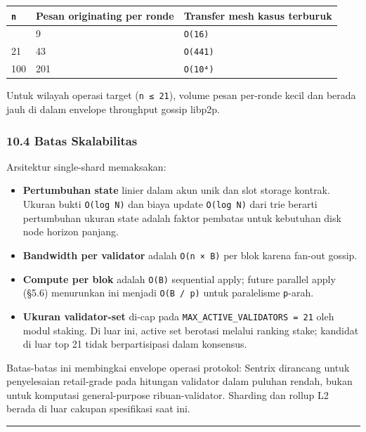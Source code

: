 \documentclass[11pt,a4paper]{article}
\providecommand{\tightlist}{\setlength{\itemsep}{0pt}\setlength{\parskip}{0pt}}
\begin{document}
\begin{longtable}[]{@{}lll@{}}
\toprule\noalign{}
\texttt{n} & Pesan originating per ronde & Transfer mesh kasus terburuk \\
\midrule\noalign{}
\endhead
\bottomrule\noalign{}
\endlastfoot
4 & 9 & \texttt{O(16)} \\
21 & 43 & \texttt{O(441)} \\
100 & 201 & \texttt{O(10⁴)} \\
\end{longtable}

Untuk wilayah operasi target (\texttt{n\ ≤\ 21}), volume pesan per-ronde kecil dan berada jauh di dalam envelope throughput gossip libp2p.

\hypertarget{batas-skalabilitas}{%
\subsubsection{10.4 Batas Skalabilitas}\label{batas-skalabilitas}}

Arsitektur single-shard memaksakan:

\begin{itemize}
\tightlist
\item
  \textbf{Pertumbuhan state} linier dalam akun unik dan slot storage kontrak. Ukuran bukti \texttt{O(log\ N)} dan biaya update \texttt{O(log\ N)} dari trie berarti pertumbuhan ukuran state adalah faktor pembatas untuk kebutuhan disk node horizon panjang.
\item
  \textbf{Bandwidth per validator} adalah \texttt{O(n\ ×\ \textbar{}B\textbar{})} per blok karena fan-out gossip.
\item
  \textbf{Compute per blok} adalah \texttt{O(\textbar{}B\textbar{})} sequential apply; future parallel apply (§5.6) menurunkan ini menjadi \texttt{O(\textbar{}B\textbar{}\ /\ p)} untuk paralelisme \texttt{p}-arah.
\item
  \textbf{Ukuran validator-set} di-cap pada \texttt{MAX\_ACTIVE\_VALIDATORS\ =\ 21} oleh modul staking. Di luar ini, active set berotasi melalui ranking stake; kandidat di luar top 21 tidak berpartisipasi dalam konsensus.
\end{itemize}

Batas-batas ini membingkai envelope operasi protokol: Sentrix dirancang untuk penyelesaian retail-grade pada hitungan validator dalam puluhan rendah, bukan untuk komputasi general-purpose ribuan-validator. Sharding dan rollup L2 berada di luar cakupan spesifikasi saat ini.

\begin{center}\rule{0.5\linewidth}{0.5pt}\end{center}
\end{document}
